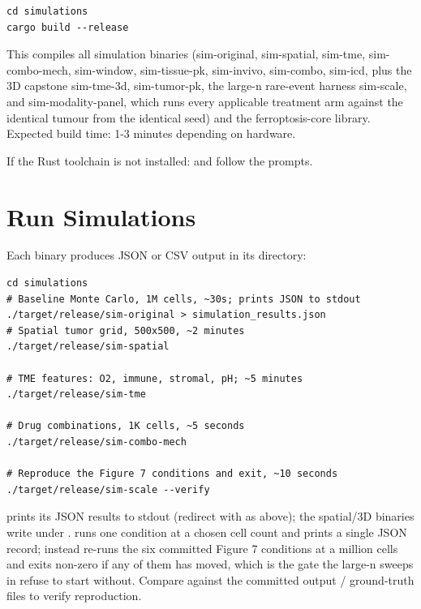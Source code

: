 \documentclass[11pt,twoside,openright]{report}
\begin{document}
\begin{bookterminal}
\begin{verbatim}
cd simulations
cargo build --release
\end{verbatim}
\end{bookterminal}

This compiles all simulation binaries (sim-original, sim-spatial, sim-tme, sim-combo-mech, sim-window, sim-tissue-pk, sim-invivo, sim-combo, sim-icd, plus the 3D capstone sim-tme-3d, sim-tumor-pk, the large-n rare-event harness sim-scale, and sim-modality-panel, which runs every applicable treatment arm against the identical tumour from the identical seed) and the ferroptosis-core library. Expected build time: 1-3 minutes depending on hardware.

If the Rust toolchain is not installed:  and follow the prompts.

\section{Run Simulations}

Each binary produces JSON or CSV output in its directory:

\begin{bookterminal}
\begin{verbatim}
cd simulations
# Baseline Monte Carlo, 1M cells, ~30s; prints JSON to stdout
./target/release/sim-original > simulation_results.json
# Spatial tumor grid, 500x500, ~2 minutes
./target/release/sim-spatial

# TME features: O2, immune, stromal, pH; ~5 minutes
./target/release/sim-tme

# Drug combinations, 1K cells, ~5 seconds
./target/release/sim-combo-mech

# Reproduce the Figure 7 conditions and exit, ~10 seconds
./target/release/sim-scale --verify
\end{verbatim}
\end{bookterminal}

 prints its JSON results to stdout (redirect with  as above); the spatial/3D binaries write under .  runs one condition at a chosen cell count and prints a single JSON record;  instead re-runs the six committed Figure 7 conditions at a million cells and exits non-zero if any of them has moved, which is the gate the large-n sweeps in  refuse to start without. Compare against the committed output / ground-truth files to verify reproduction.
\end{document}
